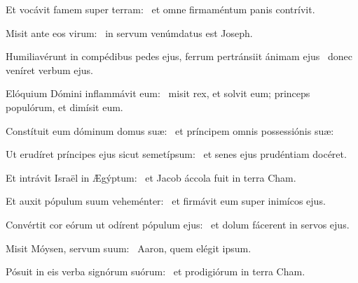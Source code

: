 
\item Et vocávit famem super terram:~\psstar{} et omne firmaméntum panis contrívit.

\item Misit ante eos virum:~\psstar{} in servum venúmdatus est Joseph.

\item Humiliavérunt in compédibus pedes ejus, ferrum pertránsiit ánimam ejus~\psstar{} donec veníret verbum ejus.

\item Elóquium Dómini inflammávit eum:~\psstar{} misit rex, et solvit eum; princeps populórum, et dimísit eum.

\item Constítuit eum dóminum domus suæ:~\psstar{} et príncipem omnis possessiónis suæ:

\item Ut erudíret príncipes ejus sicut semetípsum:~\psstar{} et senes ejus prudéntiam docéret.

\item Et intrávit Israël in Ægýptum:~\psstar{} et Jacob áccola fuit in terra Cham.

\item Et auxit pópulum suum veheménter:~\psstar{} et firmávit eum super inimícos ejus.

\item Convértit cor eórum ut odírent pópulum ejus:~\psstar{} et dolum fácerent in servos ejus.

\item Misit Móysen, servum suum:~\psstar{} Aaron, quem elégit ipsum.

\item Pósuit in eis verba signórum suórum:~\psstar{} et prodigiórum in terra Cham.
